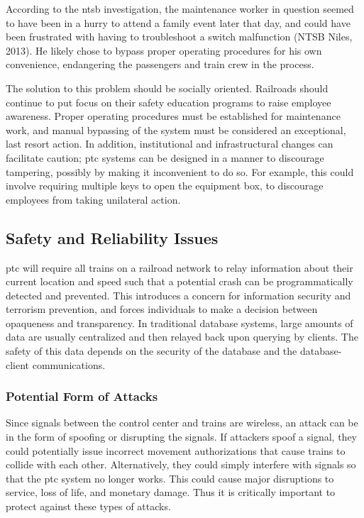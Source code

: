 \documentclass[11pt, titlepage]{article}
\begin{document}
According to the \gls{ntsb} investigation, the maintenance worker in question seemed
to have been in a hurry to attend a family event later that day, and could have been
frustrated with having to troubleshoot a switch malfunction (NTSB Niles, 2013). He likely
chose to bypass proper operating procedures for his own convenience, endangering the
passengers and train crew in the process.

The solution to this problem should be socially oriented. Railroads should continue
to put focus on their safety education programs to raise employee awareness. Proper
operating procedures must be established for maintenance work, and manual bypassing
of the system must be considered an exceptional, last resort action. In addition,
institutional and infrastructural changes can facilitate caution; \gls{ptc} systems
can be designed in a manner to discourage tampering, possibly by making it
inconvenient to do so. For example, this could involve requiring multiple keys to
open the equipment box, to discourage employees from taking unilateral action.

\subsection{Safety and Reliability Issues}

\gls{ptc} will require all trains on a railroad network to relay information about
their current location and speed such that a potential crash can be programmatically
detected and prevented. This introduces a concern for information security and
terrorism prevention, and forces individuals to make a decision between opaqueness
and transparency. In traditional database systems, large amounts of data are usually
centralized and then relayed back upon querying by clients. The safety of this data
depends on the security of the database and the database-client communications.

\subsubsection{Potential Form of Attacks}

Since signals between the control center and trains are wireless, an attack can be
in the form of spoofing or disrupting the signals. If attackers spoof a signal, they
could potentially issue incorrect movement authorizations that cause trains to
collide with each other. Alternatively, they could simply interfere with signals so
that the \gls{ptc} system no longer works. This could cause major disruptions to
service, loss of life, and monetary damage. Thus it is critically important to
protect against these types of attacks.
\end{document}
